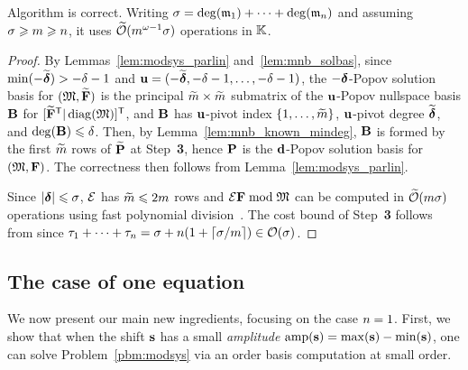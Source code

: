 \documentclass[preprint]{sig-alternate-05-2015}
\begin{document}
\vspace{-0.3cm}
\begin{prop}
  \label{prop:algo:knownmindeg_modsys}
  Algorithm  is correct. Writing $\degMod =
  \deg(\modulus_1) + \cdots + \deg(\modulus_\nbeq)$ and assuming $\degMod \ge
  \nbun \ge \nbeq$, it uses $\softO{ \nbun^{\expmatmul-1} \degMod }$ operations
  in $\field$.
\end{prop}
\vspace{-0.3cm}
\begin{proof}
  By Lemmas~\ref{lem:modsys_parlin} and~\ref{lem:mnb_solbas}, since
  $\min(-\expand{\minDegs}) > -\minDeg-1$ and $\shifts[u] =
  (-\expand{\minDegs},-\maxDeg-1,\ldots,-\maxDeg-1)$, the $-\minDegs$-Popov
  solution basis for $(\Modulus,\expand{\sys})$ is the principal
  $\expand{\nbun} \times \expand{\nbun}$ submatrix of the $\shifts[u]$-Popov
  nullspace basis $\mat{B}$ for
  $\trsp{[\trsp{\expand{\sys}}|\diag{\Modulus}]}$, and $\mat{B}$ has
  $\shifts[u]$-pivot index $\{1,\ldots,\expand{\nbun}\}$, $\shifts[u]$-pivot
  degree $\expand{\minDegs}$, and $\deg(\mat{B}) \le \minDeg$. Then, by
  Lemma~\ref{lem:mnb_known_mindeg}, $\mat{B}$ is formed by the first
  $\expand{\nbun}$ rows of $\expand{\mat{P}}$ at Step~\textbf{3}, hence
  $\mat{P}$ is the $\shifts[d]$-Popov solution basis for $(\Modulus,\sys)$. The
  correctness then follows from Lemma~\ref{lem:modsys_parlin}. 

  Since $\sumVec{\minDegs} \le \degMod$, $\expandMat$ has $\expand{\rdim} \le
  2\rdim$ rows and $\expandMat \sys \bmod \Modulus$ can be computed in
  $\softO{\nbun \degMod}$ operations using fast polynomial
  division~\cite{vzGathen13}. The cost bound of Step~\textbf{3} follows from
  \cite[Theorem~1.4]{JeNeScVi16} since $\tau_1 + \cdots + \tau_\nbeq = \degMod
  + \nbeq(1+\lceil \degMod / \nbun \rceil) \in \bigO{\degMod}$.
\end{proof}

\subsection{The case of one equation}
\label{subsec:modsys_one}

We now present our main new ingredients, focusing on the case $\nbeq=1$. First,
we show that when the shift $\shifts$ has a small \emph{amplitude} $\amp =
\max(\shifts)-\min(\shifts)$, one can solve Problem~\ref{pbm:modsys} via an
order basis computation at small order.
\end{document}
